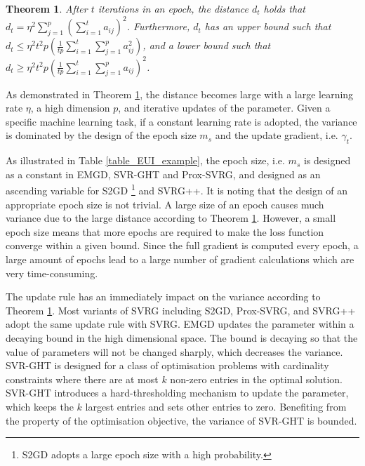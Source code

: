 \documentclass[letterpaper]{article}
\begin{document}
\newtheorem{Theorem}{\bf{Theorem}}
\newtheorem{Corollary}{\bf{Corollary}}
\newtheorem{Lemma}{\bf{Lemma}}
\newtheorem{Assumption}{\bf{Assumption}}


\begin{Theorem}
\label{theorem_vr_lower_bound}
   After $t$ iterations in an epoch, the distance $d_t$ holds that $d_t \mathrm{=} \eta^2 \sum\limits_{j=1}^p\left(  \sum\limits_{i=1}^t a_{ij}  \right)^2$. Furthermore, $d_t$ has an upper bound such that 
   $d_t \mathrm{\le} \eta^2 t^2p  \left( \frac{1}{tp}\sum\limits_{i=1}^t   \sum\limits_{j=1}^p   a_{ij}^2 \right)$, and a lower bound such that $d_t  \mathrm{\ge} \eta^2t^2p \left(\frac{1}{tp}\sum\limits_{i=1}^t   \sum\limits_{j=1}^p   a_{ij}\right)^2$.
\end{Theorem}


As demonstrated in Theorem \ref{theorem_vr_lower_bound}, the distance becomes large with a large learning rate $\eta$, a high dimension $p$, and iterative updates of the parameter. Given a specific machine learning task, if a constant learning rate is adopted, the variance is dominated by the  design of the epoch size $m_s$ and the update gradient, i.e.  $\gamma_t$.  

 As illustrated in Table \ref{table_EUI_example}, the epoch size, i.e. $m_s$ is designed as a constant in EMGD, SVR-GHT and Prox-SVRG, and designed as an ascending variable for  S2GD \footnote{S2GD adopts a large epoch size with a high probability.} and SVRG++.  It is noting that the design of an appropriate epoch size is not trivial. A large size of an epoch causes much variance due to the large distance according to Theorem \ref{theorem_vr_lower_bound}. However, a small epoch size means that more epochs are required to make the loss function converge within a given bound. Since the full gradient is  computed every epoch, a large amount of epochs  lead to a large number of gradient calculations which are very time-consuming.  

The update rule has an immediately impact on the variance according to Theorem \ref{theorem_vr_lower_bound}. Most variants of SVRG including S2GD, Prox-SVRG, and SVRG++ adopt the same update rule with SVRG. EMGD updates the parameter within a decaying bound in the high dimensional space. The bound is decaying so that the value of parameters will not be changed sharply, which decreases the variance.  SVR-GHT is designed for a class of optimisation problems with cardinality constraints where there are at most $k$ non-zero entries in the optimal solution. SVR-GHT  introduces a hard-thresholding mechanism to update the parameter, which keeps the $k$ largest entries and sets other entries to zero. Benefiting from  the property of the optimisation objective, the variance of SVR-GHT is bounded.
\end{document}
